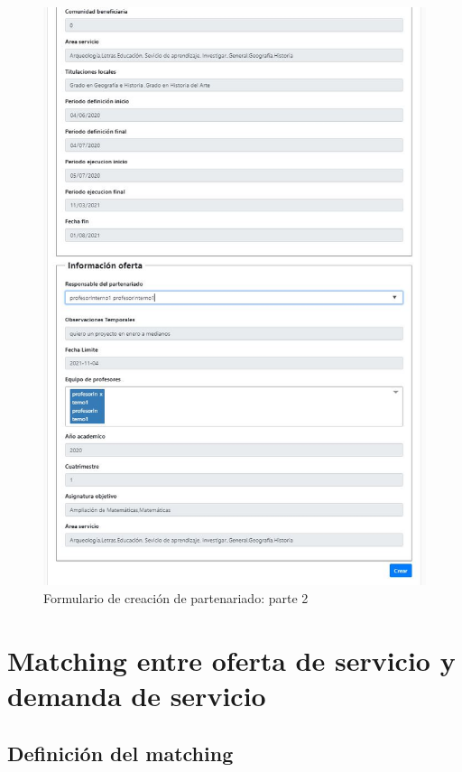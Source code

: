 \documentclass[11pt]{article}
\begin{document}
\begin{figure}
	\centering
	\includegraphics[scale=0.9]{partenariado2}
	\caption{Formulario de creación de partenariado: parte 2}
\end{figure}

\section{Matching entre oferta de servicio y demanda de servicio}

\subsection{Definición del matching }
\end{document}
